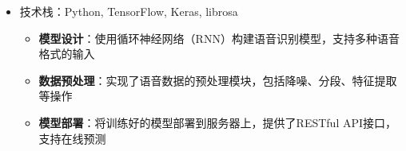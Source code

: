 \documentclass[zh]{resume}
\begin{document}
\begin{itemize}[leftmargin=1.5em, nosep, before=\vspace{-0.5em}, after=\vspace{-0.5em}]
  \vspace{-0.8em} 
  \item[] 
    {技术栈：Python, TensorFlow, Keras, librosa} 
    {\begin{itemize}[label=\faAngleRight, leftmargin=2.2em, nosep, topsep=0pt] 
        \item \textbf{模型设计}：使用循环神经网络（RNN）构建语音识别模型，支持多种语音格式的输入 
        \item \textbf{数据预处理}：实现了语音数据的预处理模块，包括降噪、分段、特征提取等操作 
        \item \textbf{模型部署}：将训练好的模型部署到服务器上，提供了RESTful API接口，支持在线预测 
     \end{itemize}} 
\end{itemize} 
\end{document}
